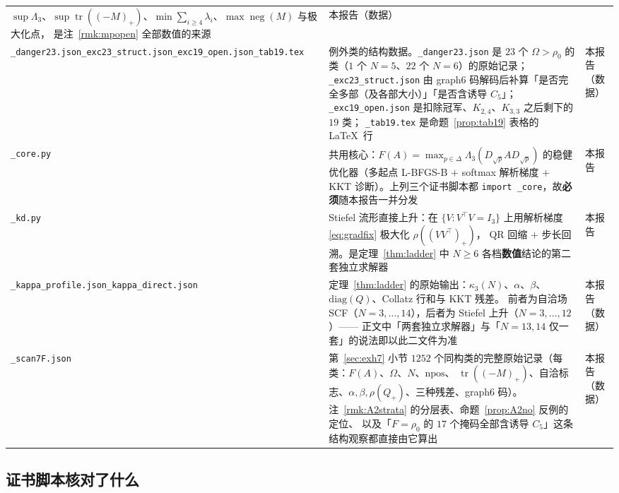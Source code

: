 \documentclass[UTF8,11pt]{ctexart}
\theoremstyle{definition}
\newcommand{\Lam}{\Lambda}
\newcommand{\tr}{\operatorname{tr}}
\begin{document}
{\begin{longtable}{@{}p{6.9cm}p{6.4cm}p{2.0cm}@{}}
$\sup\Lam_3$、$\sup\tr((-M)_+)$、$\min\sum_{i\ge4}\lambda_i$、$\max\operatorname{neg}(M)$ 与极大化点，
是注~\ref{rmk:mpopen} 全部数值的来源 &
本报告（数据） \\
\texttt{\_danger23.json}\newline\texttt{\_exc23\_struct.json}\newline\texttt{\_exc19\_open.json}\newline\texttt{\_tab19.tex} &
例外类的结构数据。\texttt{\_danger23.json} 是 $23$ 个 $\Omega>\rho_0$ 的类（$1$ 个 $N=5$、$22$ 个 $N=6$）的原始记录；
\texttt{\_exc23\_struct.json} 由 graph6 码解码后补算「是否完全多部（及各部大小）」「是否含诱导 $C_5$」；
\texttt{\_exc19\_open.json} 是扣除冠军、$K_{2,4}$、$K_{3,3}$ 之后剩下的 $19$ 类；
\texttt{\_tab19.tex} 是命题~\ref{prop:tab19} 表格的 \LaTeX\ 行 &
本报告（数据） \\
\texttt{\_core.py} &
共用核心：$F(A)=\max_{p\in\Delta}\Lam_3(D_{\sqrt p}AD_{\sqrt p})$ 的稳健优化器（多起点 L-BFGS-B
$+$ softmax 解析梯度 $+$ KKT 诊断）。上列三个证书脚本都 \texttt{import \_core}，故\textbf{必须}随本报告一并分发 &
本报告 \\
\texttt{\_kd.py} &
Stiefel 流形直接上升：在 $\{V:V^\top V=I_3\}$ 上用解析梯度 \eqref{eq:gradfix} 极大化 $\rho((VV^\top)_+)$，
QR 回缩 $+$ 步长回溯。是定理~\ref{thm:ladder} 中 $N\ge6$ 各档\textbf{数值}结论的第二套独立求解器 &
本报告 \\
\texttt{\_kappa\_profile.json}\newline\texttt{\_kappa\_direct.json} &
定理~\ref{thm:ladder} 的原始输出：$\kappa_3(N)$、$\alpha$、$\beta$、$\mathrm{diag}(Q)$、Collatz 行和与 KKT 残差。
前者为自洽场 SCF（$N=3,\dots,14$），后者为 Stiefel 上升（$N=3,\dots,12$）——
正文中「两套独立求解器」与「$N=13,14$ 仅一套」的说法即以此二文件为准 &
本报告（数据） \\
\texttt{\_scan7F.json} &
第~\ref{sec:exh7} 小节 $1252$ 个同构类的完整原始记录（每类：$F(A)$、$\Omega$、$N$、$\mathrm{npos}$、
$\tr((-M)_+)$、自洽标志、$\alpha,\beta,\rho(Q_+)$、三种残差、graph6 码）。
注~\ref{rmk:A2strata} 的分层表、命题~\ref{prop:A2no} 反例的定位、
以及「$F=\rho_0$ 的 $17$ 个掩码全部含诱导 $C_5$」这条结构观察都直接由它算出 &
本报告（数据） \\
\bottomrule
\end{longtable}}

\subsection{证书脚本核对了什么}
\end{document}
